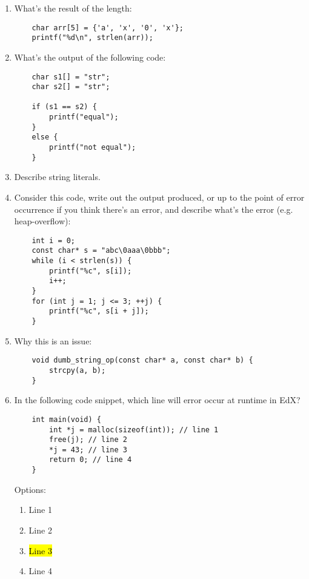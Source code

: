 \documentclass{article}
\begin{document}
\begin{enumerate}
    \item What’s the result of the length:
    \begin{lstlisting}
    char arr[5] = {'a', 'x', '0', 'x'};
    printf("%d\n", strlen(arr));
    \end{lstlisting}
    \vspace{16mm}
    \item What’s the output of the following code:
    \begin{lstlisting}
    char s1[] = "str";
    char s2[] = "str";
    
    if (s1 == s2) {
        printf("equal");
    }
    else {
        printf("not equal");
    }
    \end{lstlisting}
    \vspace{16mm}
    \item Describe string literals.
    \vspace{16mm}
    \item Consider this code, write out the output produced, or up to the point of error occurrence if you think there’s an error, and describe what’s the error (e.g. heap-overflow):
    \begin{lstlisting}
    int i = 0;
    const char* s = "abc\0aaa\0bbb";
    while (i < strlen(s)) {
        printf("%c", s[i]);
        i++;
    }
    for (int j = 1; j <= 3; ++j) {
        printf("%c", s[i + j]);
    }
    \end{lstlisting}
    \vspace{16mm}
    \item Why this is an issue:
    \begin{lstlisting}
    void dumb_string_op(const char* a, const char* b) {
        strcpy(a, b);
    }
    \end{lstlisting}
    \vspace{16mm}
    \item In the following code snippet, which line will error occur at runtime in EdX?
    \begin{lstlisting}
    int main(void) {
        int *j = malloc(sizeof(int)); // line 1
        free(j); // line 2
        *j = 43; // line 3
        return 0; // line 4
    }
    \end{lstlisting}
    Options:
    \begin{enumerate}[label=\alph*.]
        \item Line 1
        \item Line 2
        \item \hl{Line 3}
        \item Line 4

\end{enumerate}
\end{enumerate}
\end{document}
